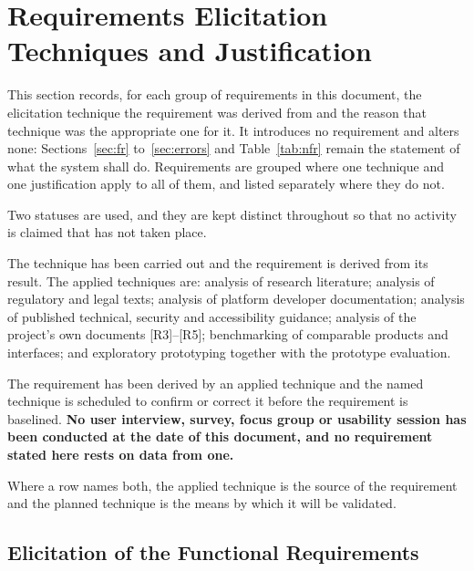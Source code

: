 \documentclass[11pt,a4paper]{report}
\begin{document}
\section{Requirements Elicitation Techniques and Justification}
\label{sec:elicitation}
This section records, for each group of requirements in this document, the elicitation
technique the requirement was derived from and the reason that technique was the appropriate
one for it. It introduces no requirement and alters none: Sections~\ref{sec:fr}
to~\ref{sec:errors} and Table~\ref{tab:nfr} remain the statement of what the system shall do.
Requirements are grouped where one technique and one justification apply to all of them, and
listed separately where they do not.

Two statuses are used, and they are kept distinct throughout so that no activity is claimed
that has not taken place.

\begin{description}[style=nextline,leftmargin=0pt]
  \item[Applied] The technique has been carried out and the requirement is derived from its
        result. The applied techniques are: analysis of research literature; analysis of
        regulatory and legal texts; analysis of platform developer documentation; analysis of
        published technical, security and accessibility guidance; analysis of the project's
        own documents [R3]--[R5]; benchmarking of comparable products and interfaces; and
        exploratory prototyping together with the prototype evaluation.
  \item[Planned for validation] The requirement has been derived by an applied technique and
        the named technique is scheduled to confirm or correct it before the requirement is
        baselined. \textbf{No user interview, survey, focus group or usability session has
        been conducted at the date of this document, and no requirement stated here rests on
        data from one.}
\end{description}

\noindent Where a row names both, the applied technique is the source of the requirement and
the planned technique is the means by which it will be validated.

\subsection{Elicitation of the Functional Requirements}
\end{document}
